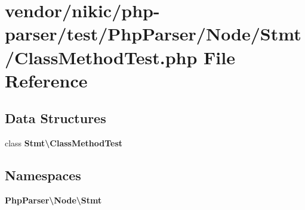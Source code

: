\section{vendor/nikic/php-\/parser/test/\+Php\+Parser/\+Node/\+Stmt/\+Class\+Method\+Test.php File Reference}
\label{_class_method_test_8php}
\subsection*{Data Structures}
\begin{DoxyCompactItemize}
\item 
class {\bf Stmt\textbackslash{}\+Class\+Method\+Test}
\end{DoxyCompactItemize}
\subsection*{Namespaces}
\begin{DoxyCompactItemize}
\item 
 {\bf Php\+Parser\textbackslash{}\+Node\textbackslash{}\+Stmt}
\end{DoxyCompactItemize}
